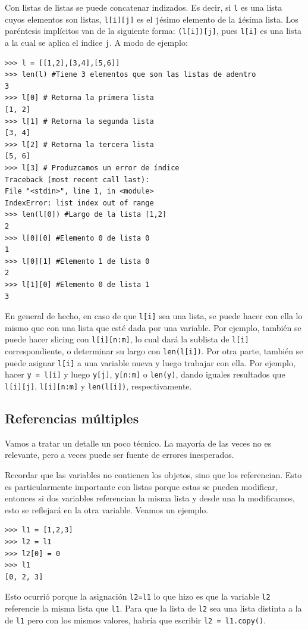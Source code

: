 \documentclass[a4paper, 12pt]{report}
\theoremstyle{definition}
\begin{document}
Con listas de listas se puede concatenar indizados. Es decir, si {\tt l} es una lista cuyos elementos son listas, {\tt l[i][j]} es el {\tt j}ésimo elemento de la {\tt i}ésima lista. Los paréntesis implícitos van de la siguiente forma: {\tt (l[i])[j]}, pues {\tt l[i]} es una lista a la cual se aplica el índice {\tt j}. A modo de ejemplo:
\begin{verbatim}
>>> l = [[1,2],[3,4],[5,6]]
>>> len(l) #Tiene 3 elementos que son las listas de adentro
3
>>> l[0] # Retorna la primera lista
[1, 2]
>>> l[1] # Retorna la segunda lista
[3, 4]
>>> l[2] # Retorna la tercera lista
[5, 6]
>>> l[3] # Produzcamos un error de índice
Traceback (most recent call last):
File "<stdin>", line 1, in <module>
IndexError: list index out of range
>>> len(l[0]) #Largo de la lista [1,2]
2
>>> l[0][0] #Elemento 0 de lista 0
1
>>> l[0][1] #Elemento 1 de lista 0
2
>>> l[1][0] #Elemento 0 de lista 1
3
\end{verbatim}
En general de hecho, en caso de que {\tt l[i]} sea una lista, se puede hacer con ella lo mismo que con una lista que esté dada por una variable. Por ejemplo, también se puede hacer slicing con {\tt l[i][n:m]}, lo cual dará la sublista de {\tt l[i]} correspondiente, o determinar su largo con {\tt len(l[i])}. Por otra parte, también se puede asignar {\tt l[i]} a una variable nueva y luego trabajar con ella. Por ejemplo, hacer {\tt y = l[i]} y luego {\tt y[j]}, {\tt y[n:m]} o {\tt len(y)}, dando iguales resultados que {\tt l[i][j]}, {\tt l[i][n:m]} y {\tt len(l[i])}, respectivamente.
\subsection{Referencias múltiples}\label{sec-memoriaCompartida}

Vamos a tratar un detalle un poco técnico. La mayoría de las veces no es relevante, pero a veces puede ser fuente de errores inesperados.

Recordar que las variables no contienen los objetos, sino que los referencian. Esto es particularmente importante con listas porque estas se pueden modificar, entonces si dos variables referencian la misma lista y desde una la modificamos, esto se reflejará en la otra variable. Veamos un ejemplo.
\begin{verbatim}
>>> l1 = [1,2,3]
>>> l2 = l1
>>> l2[0] = 0
>>> l1
[0, 2, 3]
\end{verbatim}
Esto ocurrió porque la asignación {\tt l2=l1} lo que hizo es que la variable {\tt l2} referencie la misma lista que {\tt l1}. Para que la lista de {\tt l2} sea una lista distinta a la de {\tt l1} pero con los mismos valores, habría que escribir {\tt l2 = l1.copy()}.
\end{document}
